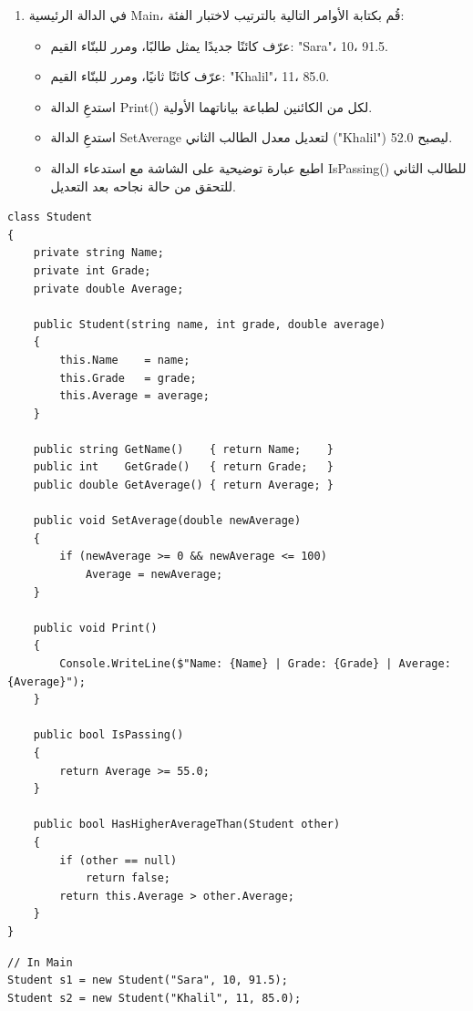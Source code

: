 \documentclass[14pt]{extarticle}
\begin{document}
\begin{enumerate}[itemsep=2em]
\begin{enumerate}[itemsep=1em]
    \item في الدالة الرئيسية \textenglish{Main}، قُم بكتابة الأوامر التالية بالترتيب لاختبار الفئة:
    \begin{itemize}[itemsep=1pt]
        \item عرّف كائنًا جديدًا يمثل طالبًا، ومرر للبنّاء القيم: \textenglish{"Sara"}، \textenglish{10}، \textenglish{91.5}.
        \item عرّف كائنًا ثانيًا، ومرر للبنّاء القيم: \textenglish{"Khalil"}، \textenglish{11}، \textenglish{85.0}.
        \item استدعِ الدالة \textenglish{Print()} لكل من الكائنين لطباعة بياناتهما الأولية.
        \item استدعِ الدالة \textenglish{SetAverage} لتعديل معدل الطالب الثاني (\textenglish{"Khalil"}) ليصبح \textenglish{52.0}.
        \item اطبع عبارة توضيحية على الشاشة مع استدعاء الدالة \textenglish{IsPassing()} للطالب الثاني للتحقق من حالة نجاحه بعد التعديل.
    \end{itemize}
\end{enumerate}

\ifwithsols
{\small
\begin{boxSolution}
\begin{english}
\begin{verbatim}
class Student
{
    private string Name;
    private int Grade;
    private double Average;

    public Student(string name, int grade, double average)
    {
        this.Name    = name;
        this.Grade   = grade;
        this.Average = average;
    }

    public string GetName()    { return Name;    }
    public int    GetGrade()   { return Grade;   }
    public double GetAverage() { return Average; }

    public void SetAverage(double newAverage)
    {
        if (newAverage >= 0 && newAverage <= 100)
            Average = newAverage;
    }

    public void Print()
    {
        Console.WriteLine($"Name: {Name} | Grade: {Grade} | Average: {Average}");
    }

    public bool IsPassing()
    {
        return Average >= 55.0;
    }

    public bool HasHigherAverageThan(Student other)
    {
        if (other == null)
            return false;
        return this.Average > other.Average;
    }
}
\end{verbatim}
\end{english}
\end{boxSolution}
\begin{boxSolution}
\begin{english}
\begin{verbatim}
// In Main
Student s1 = new Student("Sara", 10, 91.5);
Student s2 = new Student("Khalil", 11, 85.0);


\end{verbatim}
\end{english}
\end{boxSolution}}
\end{enumerate}
\end{document}
